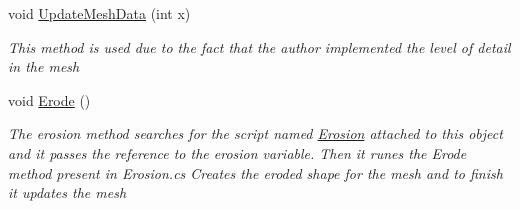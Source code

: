 \begin{DoxyCompactItemize}
void \mbox{\hyperlink{class_assets_1_1_scripts_1_1_mesh_generation_abaeb22e0f390a218be5d9543138f52b9}{Update\+Mesh\+Data}} (int x)
\begin{DoxyCompactList}\small\item\em This method is used due to the fact that the author implemented the level of detail in the mesh \end{DoxyCompactList}\item 
void \mbox{\hyperlink{class_assets_1_1_scripts_1_1_mesh_generation_a4ca64ff2f5c1b7f9073699905628e6dd}{Erode}} ()
\begin{DoxyCompactList}\small\item\em The erosion method searches for the script named \mbox{\hyperlink{class_assets_1_1_scripts_1_1_erosion}{Erosion}} attached to this object and it passes the reference to the erosion variable. Then it runes the Erode method present in Erosion.\+cs Creates the eroded shape for the mesh and to finish it updates the mesh \end{DoxyCompactList}\end{DoxyCompactItemize}
